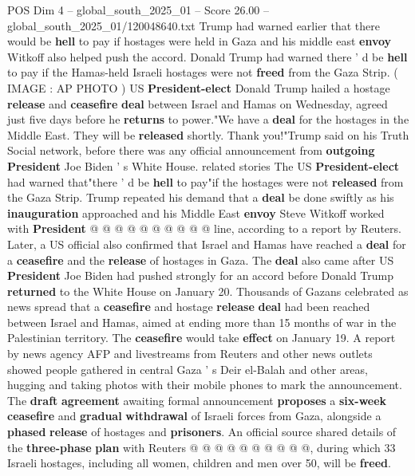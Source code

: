 \begin{textsample}{POS Dim 4 – global\_south\_2025\_01 – Score 26.00 – global\_south\_2025\_01/120048640.txt}  \label{ex:f4_pos_017}
Trump had warned earlier that there would be \textbf{hell} to pay if hostages were held in Gaza and his middle east \textbf{envoy} Witkoff also helped push the accord.
Donald Trump had warned there ' d be \textbf{hell} to pay if the Hamas-held Israeli hostages were not \textbf{freed} from the Gaza Strip. ( IMAGE : AP PHOTO ) US \textbf{President-elect} Donald Trump hailed a hostage \textbf{release} and \textbf{ceasefire} \textbf{deal} between Israel and Hamas on Wednesday, agreed just five days before he \textbf{returns} to power."We have a \textbf{deal} for the hostages in the Middle East.
They will be \textbf{released} shortly.
Thank you!"Trump said on his Truth Social network, before there was any official announcement from \textbf{outgoing} \textbf{President} Joe Biden ' s White House. related stories The US \textbf{President-elect} had warned that"there ' d be \textbf{hell} to pay"if the hostages were not \textbf{released} from the Gaza Strip.
Trump repeated his demand that a \textbf{deal} be done swiftly as his \textbf{inauguration} approached and his Middle East \textbf{envoy} Steve Witkoff worked with \textbf{President} @ @ @ @ @ @ @ @ @ @ line, according to a report by Reuters.
Later, a US official also confirmed that Israel and Hamas have reached a \textbf{deal} for a \textbf{ceasefire} and the \textbf{release} of hostages in Gaza.
The \textbf{deal} also came after US \textbf{President} Joe Biden had pushed strongly for an accord before Donald Trump \textbf{returned} to the White House on January 20.
Thousands of Gazans celebrated as news spread that a \textbf{ceasefire} and hostage \textbf{release} \textbf{deal} had been reached between Israel and Hamas, aimed at ending more than 15 months of war in the Palestinian territory.
The \textbf{ceasefire} would take \textbf{effect} on January 19.
A report by news agency AFP and livestreams from Reuters and other news outlets showed people gathered in central Gaza ' s Deir el-Balah and other areas, hugging and taking photos with their mobile phones to mark the announcement.
The \textbf{draft} \textbf{agreement} awaiting formal announcement \textbf{proposes} a \textbf{six-week} \textbf{ceasefire} and \textbf{gradual} \textbf{withdrawal} of Israeli forces from Gaza, alongside a \textbf{phased} \textbf{release} of hostages and \textbf{prisoners}.
An official source shared details of the \textbf{three-phase} \textbf{plan} with Reuters @ @ @ @ @ @ @ @ @ @, during which 33 Israeli hostages, including all women, children and men over 50, will be \textbf{freed}.

\end{textsample}
